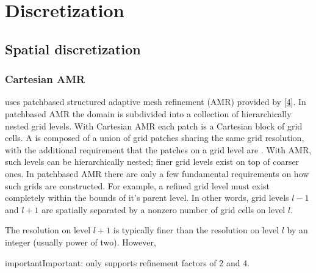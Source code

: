 \documentclass[letterpaper,10pt,english]{sphinxmanual}
\begin{document}
\chapter{Discretization}
\label{\detokenize{index:discretization}}

\section{Spatial discretization}
\label{\detokenize{Source/SpatialDiscretization:spatial-discretization}}\label{\detokenize{Source/SpatialDiscretization:chap-spatialdiscretization}}\label{\detokenize{Source/SpatialDiscretization::doc}}

\subsection{Cartesian AMR}
\label{\detokenize{Source/SpatialDiscretization:cartesian-amr}}
 uses patch\sphinxhyphen{}based structured adaptive mesh refinement (AMR) provided by  {[}\hyperlink{cite.ZZReferences:id82}{4}{]}.
In patch\sphinxhyphen{}based AMR the domain is subdivided into a collection of hierarchically nested grid levels.
With Cartesian AMR each patch is a Cartesian block of grid cells.
A  is composed of a union of grid patches sharing the same grid resolution, with the additional requirement that the patches on a grid level are .
With AMR, such levels can be hierarchically nested; finer grid levels exist on top of coarser ones.
In patch\sphinxhyphen{}based AMR there are only a few fundamental requirements on how such grids are constructed.
For example, a refined grid level must exist completely within the bounds of it’s parent level.
In other words, grid levels \(l-1\) and \(l+1\) are spatially separated by a non\sphinxhyphen{}zero number of grid cells on level \(l\).

The resolution on level \(l+1\) is typically finer than the resolution on level \(l\) by an integer (usually power of two).
However,

\begin{sphinxadmonition}{important}{Important:}
 only supports refinement factors of 2 and 4.
\end{sphinxadmonition}
\end{document}

